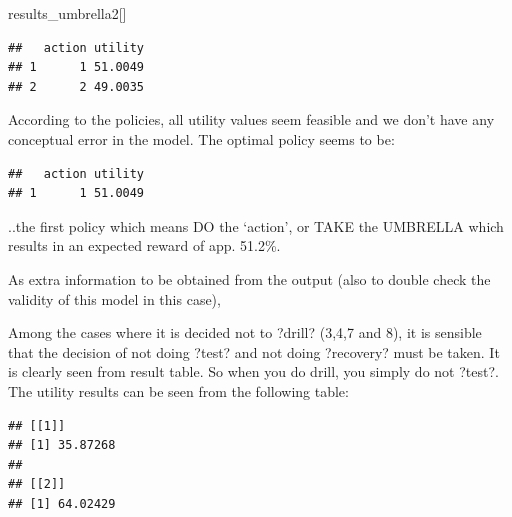 \documentclass[
]{article}
\newenvironment{Shaded}{\begin{snugshade}}{\end{snugshade}}
\newcommand{\ControlFlowTok}[1]{\textcolor[rgb]{0.13,0.29,0.53}{\textbf{#1}}}
\newcommand{\FunctionTok}[1]{\textcolor[rgb]{0.00,0.00,0.00}{#1}}
\newcommand{\NormalTok}[1]{#1}
\newcommand{\SpecialCharTok}[1]{\textcolor[rgb]{0.00,0.00,0.00}{#1}}
\newcommand{\StringTok}[1]{\textcolor[rgb]{0.31,0.60,0.02}{#1}}
\begin{document}
\begin{Shaded}
\begin{Highlighting}[]
\NormalTok{results\_umbrella2[]}
\end{Highlighting}
\end{Shaded}

\begin{verbatim}
##   action utility
## 1      1 51.0049
## 2      2 49.0035
\end{verbatim}

According to the policies, all utility values seem feasible and we don't have any conceptual error in the model.
The optimal policy seems to be:

\begin{Shaded}
\end{Shaded}

\begin{verbatim}
##   action utility
## 1      1 51.0049
\end{verbatim}

..the first policy which means DO the `action', or TAKE the UMBRELLA which results in an expected reward of app. 51.2\%.

As extra information to be obtained from the output (also to double check the validity of this model in this case),

Among the cases where it is decided not to ?drill? (3,4,7 and 8), it is sensible that the decision of not doing ?test? and not doing ?recovery? must be taken. It is clearly seen from result table.
So when you do drill, you simply do not ?test?. The utility results can be seen from the following table:

\begin{Shaded}
\end{Shaded}

\begin{verbatim}
## [[1]]
## [1] 35.87268
## 
## [[2]]
## [1] 64.02429
\end{verbatim}
\end{document}
